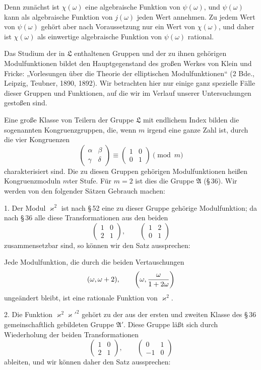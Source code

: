 \documentclass[11pt]{article}
\begin{document}
Denn zunächst ist $\chi(\omega)$ eine algebraische Funktion von $\psi(\omega)$, und $\psi(\omega)$ kann als algebraische Funktion von $j(\omega)$ jeden Wert annehmen. Zu jedem Wert von $\psi(\omega)$ gehört aber nach Voraussetzung nur ein Wert von $\chi(\omega)$, und daher ist $\chi(\omega)$ als einwertige algebraische Funktion von $\psi(\omega)$ rational.

Das Studium der in $\mathfrak L$ enthaltenen Gruppen und der zu ihnen gehörigen Modulfunktionen bildet den Hauptgegenstand des großen Werkes von Klein und Fricke: „Vorlesungen über die Theorie der elliptischen Modulfunktionen“ (2 Bde., Leipzig, Teubner, 1890, 1892). Wir betrachten hier nur einige ganz spezielle Fälle dieser Gruppen und Funktionen, auf die wir im Verlauf unserer Untersuchungen gestoßen sind.

Eine große Klasse von Teilern der Gruppe $\mathfrak L$ mit endlichem Index bilden die sogenannten Kongruenzgruppen, die, wenn $m$ irgend eine ganze Zahl ist, durch die vier Kongruenzen
\[
\begin{pmatrix}\alpha&\beta\\ \gamma&\delta\end{pmatrix}
\equiv
\begin{pmatrix}1&0\\0&1\end{pmatrix}
\pmod m
\]
charakterisiert sind. Die zu diesen Gruppen gehörigen Modulfunktionen heißen Kongruenzmoduln $m$ter Stufe. Für $m=2$ ist dies die Gruppe $\mathfrak A$ (\S\,36). Wir werden von den folgender Sätzen Gebrauch machen:

1. Der Modul $\varkappa^2$ ist nach \S\,52 eine zu dieser Gruppe gehörige Modulfunktion; da nach \S\,36 alle diese Transformationen aus den beiden
\[
\begin{pmatrix}1&0\\2&1\end{pmatrix},
\qquad
\begin{pmatrix}1&2\\0&1\end{pmatrix}
\]
zusammensetzbar sind, so können wir den Satz aussprechen:

Jede Modulfunktion, die durch die beiden Vertauschungen
\[
(\omega,\omega+2),
\qquad
\left(\omega,{\omega\over1+2\omega}\right)
\]
ungeändert bleibt, ist eine rationale Funktion von $\varkappa^2$.

2. Die Funktion $\varkappa^2\varkappa'^2$ gehört zu der aus der ersten und zweiten Klasse des \S\,36 gemeinschaftlich gebildeten Gruppe $\mathfrak A'$. Diese Gruppe läßt sich durch Wiederholung der beiden Transformationen
\[
\begin{pmatrix}1&0\\2&1\end{pmatrix},
\qquad
\begin{pmatrix}0&1\\-1&0\end{pmatrix}
\]
ableiten, und wir können daher den Satz aussprechen:
\end{document}
